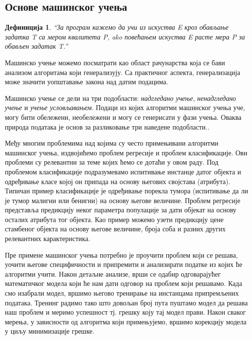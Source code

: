 \documentclass[a4paper]{article}
\newtheorem{definic}{Дефиниција}
\begin{document}
{\subsection{Основе машинског учења}
\begin{definic}
``За програм кажемо да учи из искуства E кроз обављање задатка T са мером квалитета P, ako повећањем искуства E расте мера P за обављен задатак T.''
\\[5pt]
\end{definic}


Машинско учење можемо посматрати као област рачунарства која се бави анализом алгоритама који генерализују. Са практичног аспекта, генерализација може значити уопштавање закона над датим подацима.


Машинско учење се дели на три подобласти: \textit{надгледано учење}, \textit{ненадгледано учење} и \textit{учење условљавањем}. Подаци из којих алгоритми машинског учења уче, могу бити обележени, необележени и могу се генерисати у фази учења. Оваква природа података је основ за разликовање три наведене подобласти.\cite{tom-ml}.


Међу многим проблемима над којима су често примењивани алгоритми машинског учења, издвојићемо проблем регресије и проблем класификације. Ови проблеми су релевантни за теме којих ћемо се дотаћи у овом раду. Под проблемом класификације подразумевамо испитивање инстанце датог објекта и одређивање класе којој он припада на основу његових својстава (атрибута). Типичан пример класификације је одређивање порекла тумора (испитивање да ли је тумор малигни или бенигни) на основу његове величине. Проблем регресије представља предикцију неког параметра популације за дати објекат на основу осталих атрибута тог објекта. Као пример можемо узети предикцију цене стамбеног објекта на основу његове величине, броја соба и разних других релевантних карактеристика.


Пре примене машинског учења потребно је проучити проблем који се решава, уочити његове специфичности и припремити и анализирати податке из којих ће алгоритми учити. Након детаљне анализе, врши се одабир одговарајућег математичког модела који ће нам дати одговор на проблем који решавамо. Када смо изабрали модел, вршимо његово тренирање на инстанцама припремљених података. Тренинг радимо тако што довољан број пута пуштамо модел да решава наш проблем и меримо успешност тј. грешку коју тај модел прави. Након сваког мерења, у зависности од алгоритма који примењујемо, вршимо корекцију модела у циљу минимизације грешке.


}
\end{document}
